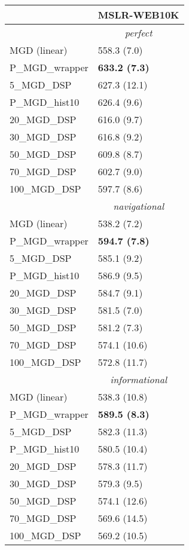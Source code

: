 \begin{tabular*}{\textwidth}{@{\extracolsep{\fill} } l  l  }
\toprule
 & { \small \textbf{MSLR-WEB10K}} \\
\midrule
& \multicolumn{1}{|c|}{\textit{perfect}} \\
\midrule
MGD (linear) & 558.3 {\tiny (7.0)} \\
P\_MGD\_wrapper & \bf 633.2 {\tiny (7.3)} \\
5\_MGD\_DSP & 627.3 {\tiny (12.1)} \\
P\_MGD\_hist10 & 626.4 {\tiny (9.6)} \\
20\_MGD\_DSP & 616.0 {\tiny (9.7)} \\
30\_MGD\_DSP & 616.8 {\tiny (9.2)} \\
50\_MGD\_DSP & 609.8 {\tiny (8.7)} \\
70\_MGD\_DSP & 602.7 {\tiny (9.0)} \\
100\_MGD\_DSP & 597.7 {\tiny (8.6)} \\
\midrule
& \multicolumn{1}{|c|}{\textit{navigational}} \\
\midrule
MGD (linear) & 538.2 {\tiny (7.2)} \\
P\_MGD\_wrapper & \bf 594.7 {\tiny (7.8)} \\
5\_MGD\_DSP & 585.1 {\tiny (9.2)} \\
P\_MGD\_hist10 & 586.9 {\tiny (9.5)} \\
20\_MGD\_DSP & 584.7 {\tiny (9.1)} \\
30\_MGD\_DSP & 581.5 {\tiny (7.0)} \\
50\_MGD\_DSP & 581.2 {\tiny (7.3)} \\
70\_MGD\_DSP & 574.1 {\tiny (10.6)} \\
100\_MGD\_DSP & 572.8 {\tiny (11.7)} \\
\midrule
& \multicolumn{1}{|c|}{\textit{informational}} \\
\midrule
MGD (linear) & 538.3 {\tiny (10.8)} \\
P\_MGD\_wrapper & \bf 589.5 {\tiny (8.3)} \\
5\_MGD\_DSP & 582.3 {\tiny (11.3)} \\
P\_MGD\_hist10 & 580.5 {\tiny (10.4)} \\
20\_MGD\_DSP & 578.3 {\tiny (11.7)} \\
30\_MGD\_DSP & 579.3 {\tiny (9.5)} \\
50\_MGD\_DSP & 574.1 {\tiny (12.6)} \\
70\_MGD\_DSP & 569.6 {\tiny (14.5)} \\
100\_MGD\_DSP & 569.2 {\tiny (10.5)} \\
\bottomrule
\end{tabular*}
